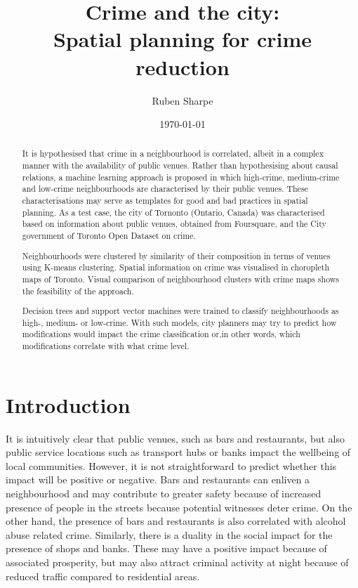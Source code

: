 \documentclass{article}
\author{Ruben Sharpe}
\title{Crime and the city:\\Spatial planning for crime reduction}
\date{\today}
\begin{document}
\maketitle

\begin{abstract}
 It is hypothesised that crime in a neighbourhood is correlated, albeit in a complex manner with the availability of public venues. Rather than hypothesising about causal relations, a machine learning approach is proposed in which high-crime, medium-crime and low-crime neighbourhoods are characterised by their public venues. These characterisations may serve as templates for good and bad practices in spatial planning.
 As a test case, the city of Tornonto (Ontario, Canada) was characterised based on information about public venues, obtained from Foursquare, and the City government of Toronto Open Dataset on crime. 
 
 Neighbourhoods were clustered by similarity of their composition in terms of venues using K-means clustering.  
 Spatial information on crime was visualised in choropleth maps of Toronto. Visual comparison of neighbourhood clusters with crime maps shows the feasibility of the approach.
 
 Decision trees and support vector machines were trained to classify neighbourhoods as high-, medium- or low-crime. With such models, city planners may try to predict how modifications would impact the crime classification or,in other words, which modifications correlate with what crime level.
\end{abstract}

\tableofcontents



\section{Introduction}
It is intuitively clear that public venues, such as bars and restaurants, but also public service locations such as transport hubs or banks impact the wellbeing of local communities. However, it is not straightforward to predict whether this impact will be positive or negative. Bars and restaurants can enliven a neighbourhood and may contribute to greater safety because of increased presence of people in the streets because potential witnesses deter crime. On the other hand, the presence of bars and restaurants is also correlated with alcohol abuse related crime. Similarly, there is a duality in the social impact for the presence of shops and banks. These may have a positive impact because of associated prosperity, but may also attract criminal activity at night because of reduced traffic compared to residential areas.\\
\end{document}
